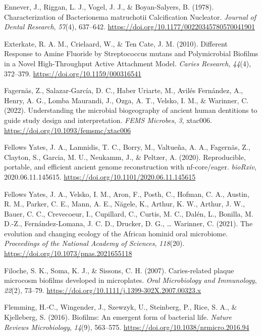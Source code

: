 \documentclass[
  b5paper,
]{book}
\newlength{\cslhangindent}
\newenvironment{CSLReferences}[2] %
 {\begin{list}{}{%
  \setlength{\itemindent}{0pt}
  \setlength{\leftmargin}{0pt}
  \setlength{\parsep}{0pt}
  \ifodd #1
   \setlength{\leftmargin}{\cslhangindent}
   \setlength{\itemindent}{-1\cslhangindent}
  \fi
  \setlength{\itemsep}{#2\baselineskip}}}
 {\end{list}}
\begin{document}
\begin{CSLReferences}{1}{0}
Ennever, J., Riggan, L. J., Vogel, J. J., \& Boyan-Salyers, B. (1978).
Characterization of {Bacterionema} matruchotii {Calcification
Nucleator}. \emph{Journal of Dental Research}, \emph{57}(4), 637--642.
\url{https://doi.org/10.1177/00220345780570041901}

Exterkate, R. A. M., Crielaard, W., \& Ten Cate, J. M. (2010). Different
{Response} to {Amine Fluoride} by {Streptococcus} mutans and
{Polymicrobial Biofilms} in a {Novel High-Throughput Active Attachment
Model}. \emph{Caries Research}, \emph{44}(4), 372--379.
\url{https://doi.org/10.1159/000316541}

Fagernäs, Z., Salazar-García, D. C., Haber Uriarte, M., Avilés
Fernández, A., Henry, A. G., Lomba Maurandi, J., Ozga, A. T., Velsko, I.
M., \& Warinner, C. (2022). Understanding the microbial biogeography of
ancient human dentitions to guide study design and interpretation.
\emph{FEMS Microbes}, \emph{3}, xtac006.
\url{https://doi.org/10.1093/femsmc/xtac006}

Fellows Yates, J. A., Lamnidis, T. C., Borry, M., Valtueña, A. A.,
Fagernäs, Z., Clayton, S., Garcia, M. U., Neukamm, J., \& Peltzer, A.
(2020). Reproducible, portable, and efficient ancient genome
reconstruction with nf-core/eager. \emph{bioRxiv}, 2020.06.11.145615.
\url{https://doi.org/10.1101/2020.06.11.145615}

Fellows Yates, J. A., Velsko, I. M., Aron, F., Posth, C., Hofman, C. A.,
Austin, R. M., Parker, C. E., Mann, A. E., Nägele, K., Arthur, K. W.,
Arthur, J. W., Bauer, C. C., Crevecoeur, I., Cupillard, C., Curtis, M.
C., Dalén, L., Bonilla, M. D.-Z., Fernández-Lomana, J. C. D., Drucker,
D. G., \ldots{} Warinner, C. (2021). The evolution and changing ecology
of the {African} hominid oral microbiome. \emph{Proceedings of the
National Academy of Sciences}, \emph{118}(20).
\url{https://doi.org/10.1073/pnas.2021655118}

Filoche, S. K., Soma, K. J., \& Sissons, C. H. (2007). Caries-related
plaque microcosm biofilms developed in microplates. \emph{Oral
Microbiology and Immunology}, \emph{22}(2), 73--79.
\url{https://doi.org/10.1111/j.1399-302X.2007.00323.x}

Flemming, H.-C., Wingender, J., Szewzyk, U., Steinberg, P., Rice, S. A.,
\& Kjelleberg, S. (2016). Biofilms: An emergent form of bacterial life.
\emph{Nature Reviews Microbiology}, \emph{14}(9), 563--575.
\url{https://doi.org/10.1038/nrmicro.2016.94}


\end{CSLReferences}
\end{document}
